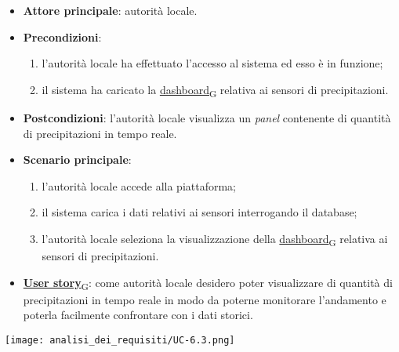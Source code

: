\begin{itemize}
	\item \textbf{Attore principale}: autorità locale.
	\item \textbf{Precondizioni}:
	      \begin{enumerate}
		      \item l'autorità locale ha effettuato l'accesso al sistema ed esso è in funzione;
		      \item il sistema ha caricato la \href{https://7last.github.io/docs/rtb/documentazione-interna/glossario\#dashboard}{dashboard\textsubscript{G}} relativa ai sensori di precipitazioni.
	      \end{enumerate}
	\item \textbf{Postcondizioni}: l'autorità locale visualizza un \textit{panel} contenente di quantità di precipitazioni in tempo reale.
	\item \textbf{Scenario principale}:
	      \begin{enumerate}
		      \item l'autorità locale accede alla piattaforma;
		      \item il sistema carica i dati relativi ai sensori interrogando il database;
		      \item l'autorità locale seleziona la visualizzazione della \href{https://7last.github.io/docs/rtb/documentazione-interna/glossario\#dashboard}{dashboard\textsubscript{G}} relativa ai sensori di precipitazioni.
	      \end{enumerate}
	\item \href{https://7last.github.io/docs/rtb/documentazione-interna/glossario\#user-story}{\textbf{User story}\textsubscript{G}}:
	      come autorità locale desidero poter visualizzare di quantità di precipitazioni in tempo reale in modo da poterne monitorare l'andamento
	      e poterla facilmente confrontare con i dati storici.
\end{itemize}
\begin{center}
	\texttt{[image: analisi\_dei\_requisiti/UC-6.3.png]}
\end{center}

\newpage

